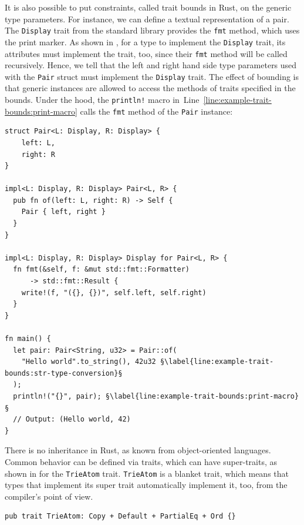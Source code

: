 \documentclass[paper=a4,%
  twoside,%
  BCOR4mm,%
  abstract=true,%
  toc=bibliography,%
  chapterprefix=true,%
  toc=bibliographynumbered,%
  open=right,%
  english,%
  pagesize=pdftex]{scrreprt}
\begin{document}
It is also possible to put constraints, called trait bounds in Rust, on the generic type parameters. For instance, we can define a textual representation of a pair. The \texttt{Display} trait from the standard library provides the \texttt{fmt} method, which uses the \texttt{\string{\string}} print marker. As shown in , for a type to implement the \texttt{Display} trait, its attributes must implement the trait, too, since their \texttt{fmt} method will be called recursively. Hence, we tell that the left and right hand side type parameters used with the \texttt{Pair} struct must implement the \texttt{Display} trait. The effect of bounding is that generic instances are allowed to access the methods of traits specified in the bounds. Under the hood, the \texttt{println!} macro in~Line~\ref{line:example-trait-bounds:print-macro} calls the \texttt{fmt} method of the \texttt{Pair} instance:
\begin{lstlisting}[style=boxed, caption={}, label=lst:example-trait-bounds, escapechar=§]
struct Pair<L: Display, R: Display> {
    left: L,
    right: R
}

impl<L: Display, R: Display> Pair<L, R> {
  pub fn of(left: L, right: R) -> Self {
    Pair { left, right }
  }
}

impl<L: Display, R: Display> Display for Pair<L, R> {
  fn fmt(&self, f: &mut std::fmt::Formatter)
      -> std::fmt::Result {
    write!(f, "({}, {})", self.left, self.right)
  }
}

fn main() {
  let pair: Pair<String, u32> = Pair::of(
    "Hello world".to_string(), 42u32 §\label{line:example-trait-bounds:str-type-conversion}§
  );
  println!("{}", pair); §\label{line:example-trait-bounds:print-macro}§
  // Output: (Hello world, 42)
}
\end{lstlisting}


There is no inheritance in Rust, as known from object-oriented languages. Common behavior can be defined via traits, which can have super-traits, as shown in  for the \texttt{TrieAtom} trait. \texttt{TrieAtom} is a blanket trait, which means that types that implement its super trait automatically implement it, too, from the compiler's point of view.
\begin{lstlisting}[style=boxed, caption={An example trait from the \emph{trying} crate}, label=lst:trying-supertraits]
pub trait TrieAtom: Copy + Default + PartialEq + Ord {}
\end{lstlisting}
\end{document}

